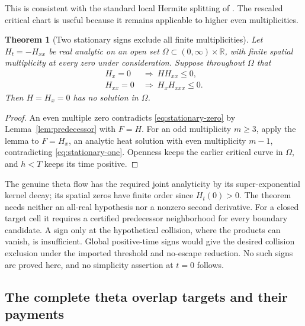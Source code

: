 \documentclass[11pt]{article}
\newtheorem{theorem}{Theorem}[section]
\theoremstyle{definition}
\theoremstyle{remark}
\begin{document}
This is consistent with the standard local Hermite splitting of
\cite[Proposition~3.1]{polymath}. The rescaled critical chart is useful
because it remains applicable to higher even multiplicities.

\begin{theorem}[Two stationary signs exclude all finite multiplicities]
\label{thm:stationary-signs}
Let $H_t=-H_{xx}$ be real analytic on an open set
$\Omega\subset(0,\infty)\times\mathbb R$, with finite spatial
multiplicity at every zero under consideration. Suppose throughout
$\Omega$ that
\begin{align}
 H_x=0&\ \Longrightarrow\ HH_{xx}\le0,\label{eq:stationary-zero}\\
 H_{xx}=0&\ \Longrightarrow\ H_xH_{xxx}\le0.\label{eq:stationary-one}
\end{align}
Then $H=H_x=0$ has no solution in $\Omega$.
\end{theorem}
\begin{proof}
An even multiple zero contradicts \eqref{eq:stationary-zero} by
Lemma~\ref{lem:predecessor} with $F=H$. For an odd multiplicity
$m\ge3$, apply the lemma to $F=H_x$, an analytic heat solution with
even multiplicity $m-1$, contradicting \eqref{eq:stationary-one}.
Openness keeps the earlier critical curve in $\Omega$, and $h<T$
keeps its time positive.
\end{proof}

The genuine theta flow has the required joint analyticity by its
super-exponential kernel decay; its spatial zeros have finite order
since $H_t(0)>0$. The theorem needs neither an all-real hypothesis nor
a nonzero second derivative. For a closed target cell it requires a
certified predecessor neighborhood for every boundary candidate. A sign
only at the hypothetical collision, where the products can vanish, is
insufficient. Global positive-time signs would give the desired collision
exclusion under the imported threshold and no-escape reduction. No such
signs are proved here, and no simplicity assertion at $t=0$ follows.

\subsection{The complete theta overlap targets and their payments}
\end{document}

